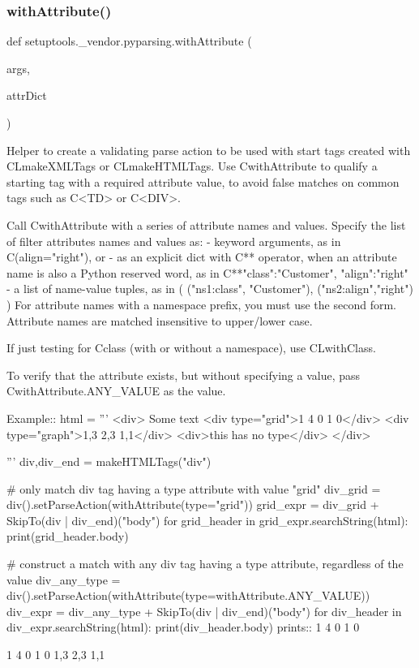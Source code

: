 \subsubsection{\texorpdfstring{with\+Attribute()}{withAttribute()}}
{\footnotesize\ttfamily def setuptools.\+\_\+vendor.\+pyparsing.\+with\+Attribute (\begin{DoxyParamCaption}\item[{}]{args,  }\item[{}]{attr\+Dict }\end{DoxyParamCaption})}

\begin{DoxyVerb}Helper to create a validating parse action to be used with start tags created
with C{L{makeXMLTags}} or C{L{makeHTMLTags}}. Use C{withAttribute} to qualify a starting tag
with a required attribute value, to avoid false matches on common tags such as
C{<TD>} or C{<DIV>}.

Call C{withAttribute} with a series of attribute names and values. Specify the list
of filter attributes names and values as:
 - keyword arguments, as in C{(align="right")}, or
 - as an explicit dict with C{**} operator, when an attribute name is also a Python
      reserved word, as in C{**{"class":"Customer", "align":"right"}}
 - a list of name-value tuples, as in ( ("ns1:class", "Customer"), ("ns2:align","right") )
For attribute names with a namespace prefix, you must use the second form.  Attribute
names are matched insensitive to upper/lower case.
   
If just testing for C{class} (with or without a namespace), use C{L{withClass}}.

To verify that the attribute exists, but without specifying a value, pass
C{withAttribute.ANY_VALUE} as the value.

Example::
    html = '''
        <div>
        Some text
        <div type="grid">1 4 0 1 0</div>
        <div type="graph">1,3 2,3 1,1</div>
        <div>this has no type</div>
        </div>
            
    '''
    div,div_end = makeHTMLTags("div")

    # only match div tag having a type attribute with value "grid"
    div_grid = div().setParseAction(withAttribute(type="grid"))
    grid_expr = div_grid + SkipTo(div | div_end)("body")
    for grid_header in grid_expr.searchString(html):
        print(grid_header.body)
    
    # construct a match with any div tag having a type attribute, regardless of the value
    div_any_type = div().setParseAction(withAttribute(type=withAttribute.ANY_VALUE))
    div_expr = div_any_type + SkipTo(div | div_end)("body")
    for div_header in div_expr.searchString(html):
        print(div_header.body)
prints::
    1 4 0 1 0

    1 4 0 1 0
    1,3 2,3 1,1
\end{DoxyVerb}
 \mbox{\label{namespacesetuptools_1_1__vendor_1_1pyparsing_a4fd4edd70ae3764a2a57bdc3815c6477}} 
